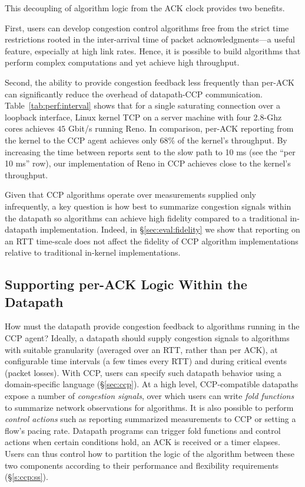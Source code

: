 This decoupling of algorithm logic from the ACK clock provides two benefits.

First, users can develop congestion control algorithms free from the strict
time restrictions rooted in the inter-arrival time of packet acknowledgments---a useful feature, especially at high link rates.
Hence, it is possible to build algorithms that perform complex computations and yet achieve high throughput.

Second, the ability to provide congestion feedback less frequently than per-ACK can significantly reduce the overhead of datapath-CCP communication.
Table~\ref{tab:perf:interval} shows that for a single saturating 
connection over a loopback interface, Linux kernel TCP on a server machine
with four 2.8-Ghz cores achieves $45$ Gbit/s running Reno.
In comparison, per-ACK reporting from the kernel to the CCP agent achieves
only 68\% of the kernel's throughput.
By increasing the time between reports sent to the slow path to 10 ms (see the
``per 10 ms'' row), our implementation of Reno in CCP achieves close to the kernel's throughput.

Given that CCP algorithms operate over measurements supplied only infrequently, a key question is how best to summarize congestion signals within the datapath so algorithms can achieve high fidelity compared to a traditional in-datapath implementation.
Indeed, in \S\ref{sec:eval:fidelity} we show that reporting on an RTT time-scale does not affect the fidelity of CCP algorithm implementations relative to traditional in-kernel implementations.

\subsection{Supporting per-ACK Logic Within the Datapath}
\label{sec:design:exercising-control-over-datapath}
\label{sec:design:restricted-datapath-functions}

How must the datapath provide congestion feedback to algorithms running in the CCP agent?
Ideally, a datapath should supply congestion signals to algorithms with suitable granularity (\eg averaged over an RTT, rather than per ACK), at configurable time intervals (\eg a few times every RTT) and during critical events (\eg packet losses).
With CCP, users can specify such datapath behavior using a domain-specific language (\S\ref{sec:ccp}). 
At a high level, CCP-compatible datapaths expose a number of {\em congestion signals}, over which users can write {\em fold functions} to summarize network observations for algorithms. 
It is also possible to perform \emph{control actions} such as reporting summarized measurements to CCP or setting a flow's pacing rate. 
Datapath programs can trigger fold functions and control actions when certain conditions hold, \eg an ACK is received or a timer elapses.
Users can thus control how to partition the logic of the algorithm between these two components according to their performance and flexibility requirements (\S\ref{s:ccp:ss}).
